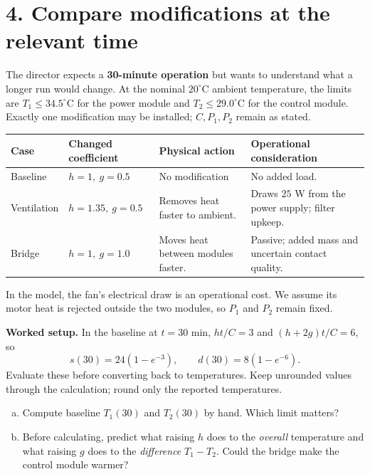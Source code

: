 \documentclass[10pt,letterpaper]{article}
\newcommand{\work}[1]{\vspace{#1}}
\begin{document}
\newpage
\section*{4. Compare modifications at the relevant time}
The director expects a \textbf{30-minute operation} but wants to understand what a longer run would change. At the nominal $20^\circ$C ambient temperature, the limits are $T_1\le34.5^\circ$C for the power module and $T_2\le29.0^\circ$C for the control module. Exactly one modification may be installed; $C,P_1,P_2$ remain as stated.

\begin{center}
\begin{tabularx}{\linewidth}{@{}p{0.75in}p{1.68in}p{1.45in}Y@{}}
\toprule
Case & Changed coefficient & Physical action & Operational consideration\\
\midrule
Baseline & $h=1,\ g=0.5$ & No modification & No added load.\\
Ventilation & $h=1.35,\ g=0.5$ & Removes heat faster to ambient. & Draws $25$ W from the power supply; filter upkeep.\\
Bridge & $h=1,\ g=1.0$ & Moves heat between modules faster. & Passive; added mass and uncertain contact quality.\\
\bottomrule
\end{tabularx}
\end{center}
In the model, the fan's electrical draw is an operational cost. We assume its motor heat is rejected outside the two modules, so $P_1$ and $P_2$ remain fixed.

\textbf{Worked setup.} In the baseline at $t=30$ min, $ht/C=3$ and $(h+2g)t/C=6$, so
\[
s(30)=24(1-e^{-3}),\qquad d(30)=8(1-e^{-6}).
\]
Evaluate these before converting back to temperatures. Keep unrounded values through the calculation; round only the reported temperatures.

\begin{enumerate}[a.,leftmargin=*]
\item Compute baseline $T_1(30)$ and $T_2(30)$ by hand. Which limit matters?\work{0.57in}
\item Before calculating, predict what raising $h$ does to the \emph{overall} temperature and what raising $g$ does to the \emph{difference} $T_1-T_2$. Could the bridge make the control module warmer?\work{0.52in}
\end{enumerate}
\end{document}
